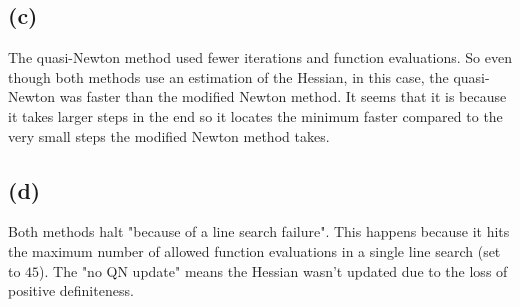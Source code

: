 \documentclass[a4paper, fleqn]{article}
\begin{document}
\subsection{(c)}
The quasi-Newton method used fewer iterations and function evaluations. So even though
both methods use an estimation of the Hessian, in this case, the quasi-Newton was faster
than the modified Newton method. It seems that it is because it takes larger steps in the
end so it locates the minimum faster compared to the very small steps the modified Newton
method takes.

\subsection{(d)}
Both methods halt "because of a line search failure". This happens because it hits the
maximum number of allowed function evaluations in a single line search (set to $45$). The
"no QN update" means the Hessian wasn't updated due to the loss of positive definiteness.
\end{document}
